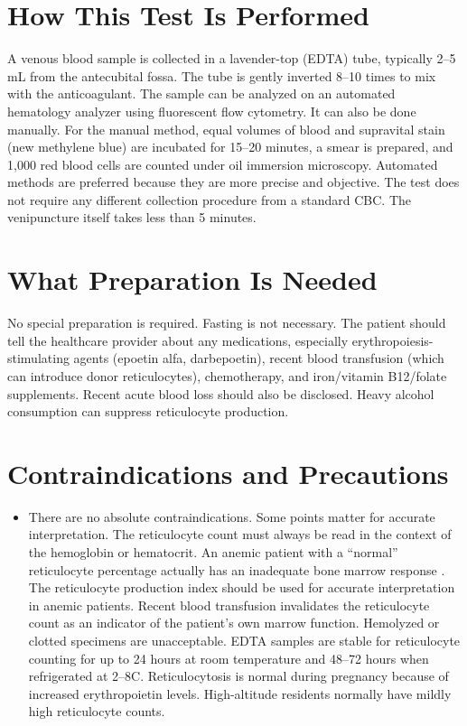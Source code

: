 \section*{How This Test Is Performed}
A venous blood sample is collected in a lavender-top (EDTA) tube, typically 2--5 mL from the antecubital fossa. The tube is gently inverted 8--10 times to mix with the anticoagulant. The sample can be analyzed on an automated hematology analyzer using fluorescent flow cytometry. It can also be done manually. For the manual method, equal volumes of blood and supravital stain (new methylene blue) are incubated for 15--20 minutes, a smear is prepared, and 1,000 red blood cells are counted under oil immersion microscopy. Automated methods are preferred because they are more precise and objective. The test does not require any different collection procedure from a standard CBC. The venipuncture itself takes less than 5 minutes.

\section*{What Preparation Is Needed}
No special preparation is required. Fasting is not necessary. The patient should tell the healthcare provider about any medications, especially erythropoiesis-stimulating agents (epoetin alfa, darbepoetin), recent blood transfusion (which can introduce donor reticulocytes), chemotherapy, and iron/vitamin B12/folate supplements. Recent acute blood loss should also be disclosed. Heavy alcohol consumption can suppress reticulocyte production.

\section*{Contraindications and Precautions}
\begin{itemize}
  \item There are no absolute contraindications. Some points matter for accurate interpretation. The reticulocyte count must always be read in the context of the hemoglobin or hematocrit. An anemic patient with a ``normal'' reticulocyte percentage actually has an inadequate bone marrow response \cite{wallach2022interpretation}. The reticulocyte production index should be used for accurate interpretation in anemic patients. Recent blood transfusion invalidates the reticulocyte count as an indicator of the patient's own marrow function. Hemolyzed or clotted specimens are unacceptable. EDTA samples are stable for reticulocyte counting for up to 24 hours at room temperature and 48--72 hours when refrigerated at 2--8\textdegree{}C. Reticulocytosis is normal during pregnancy because of increased erythropoietin levels. High-altitude residents normally have mildly high reticulocyte counts.
\end{itemize}
